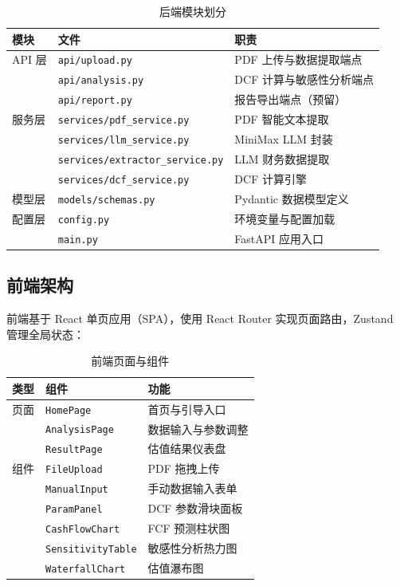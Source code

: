 \documentclass[12pt,a4paper]{article}
\begin{document}
\begin{table}[H]
\centering
\caption{后端模块划分}
\begin{tabular}{@{}lll@{}}
\toprule
\textbf{模块} & \textbf{文件} & \textbf{职责} \\
\midrule
API 层       & \texttt{api/upload.py}      & PDF 上传与数据提取端点 \\
             & \texttt{api/analysis.py}    & DCF 计算与敏感性分析端点 \\
             & \texttt{api/report.py}      & 报告导出端点（预留） \\
\midrule
服务层       & \texttt{services/pdf\_service.py}       & PDF 智能文本提取 \\
             & \texttt{services/llm\_service.py}       & MiniMax LLM 封装 \\
             & \texttt{services/extractor\_service.py} & LLM 财务数据提取 \\
             & \texttt{services/dcf\_service.py}       & DCF 计算引擎 \\
\midrule
模型层       & \texttt{models/schemas.py}  & Pydantic 数据模型定义 \\
\midrule
配置层       & \texttt{config.py}          & 环境变量与配置加载 \\
             & \texttt{main.py}            & FastAPI 应用入口 \\
\bottomrule
\end{tabular}
\end{table}

\subsection{前端架构}

前端基于 React 单页应用（SPA），使用 React Router 实现页面路由，Zustand 管理全局状态：

\begin{table}[H]
\centering
\caption{前端页面与组件}
\begin{tabular}{@{}lll@{}}
\toprule
\textbf{类型} & \textbf{组件} & \textbf{功能} \\
\midrule
页面 & \texttt{HomePage}     & 首页与引导入口 \\
     & \texttt{AnalysisPage} & 数据输入与参数调整 \\
     & \texttt{ResultPage}   & 估值结果仪表盘 \\
\midrule
组件 & \texttt{FileUpload}        & PDF 拖拽上传 \\
     & \texttt{ManualInput}       & 手动数据输入表单 \\
     & \texttt{ParamPanel}        & DCF 参数滑块面板 \\
     & \texttt{CashFlowChart}     & FCF 预测柱状图 \\
     & \texttt{SensitivityTable}  & 敏感性分析热力图 \\
     & \texttt{WaterfallChart}    & 估值瀑布图 \\
\bottomrule
\end{tabular}
\end{table}
\end{document}
